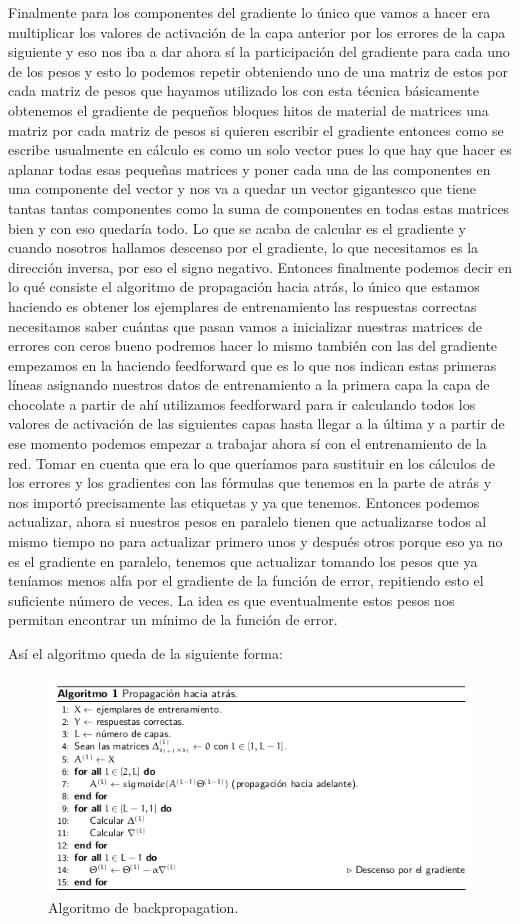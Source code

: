 Finalmente para los componentes del gradiente  lo único que vamos a hacer era multiplicar los valores de activación de la capa anterior por los errores de la capa siguiente y eso nos iba a dar ahora sí la participación del gradiente para cada uno de los pesos y esto lo podemos repetir obteniendo uno de una matriz de estos por cada matriz de pesos que hayamos utilizado los con esta técnica básicamente obtenemos el gradiente de pequeños bloques hitos de material de matrices una matriz por cada matriz de pesos si quieren escribir el gradiente entonces como se escribe usualmente en cálculo es como un solo vector pues lo que hay que hacer es aplanar todas esas pequeñas matrices y poner cada una de las componentes en una componente del vector y nos va a quedar un vector gigantesco que tiene tantas tantas componentes como la suma de componentes en todas estas matrices bien y con eso quedaría todo. 
Lo que  se acaba de calcular es el gradiente y cuando nosotros hallamos descenso por el gradiente, lo que necesitamos es la dirección inversa, por eso el signo negativo. Entonces finalmente podemos decir en lo qué consiste el algoritmo de propagación hacia atrás, lo único que estamos haciendo es obtener los ejemplares de entrenamiento las respuestas correctas necesitamos saber cuántas que pasan vamos a inicializar nuestras matrices de errores con ceros bueno podremos hacer lo mismo también con las del gradiente empezamos en la haciendo feedforward que es lo que nos indican estas primeras líneas asignando nuestros datos de entrenamiento a la primera capa la capa de chocolate a partir de ahí utilizamos feedforward para ir calculando todos los valores de activación de las siguientes capas hasta llegar a la última y a partir de ese momento podemos empezar a trabajar ahora sí con el entrenamiento de la red. Tomar en cuenta que era lo que queríamos para sustituir en los cálculos de los errores y los gradientes con las fórmulas que tenemos en la parte de atrás y nos importó precisamente las etiquetas y ya que tenemos. Entonces podemos actualizar, ahora si nuestros pesos en paralelo tienen que actualizarse todos al mismo tiempo no para actualizar primero unos y después otros porque eso ya no es el gradiente en paralelo, tenemos que actualizar tomando los pesos que ya teníamos menos alfa por el gradiente de la función de error, repitiendo esto el suficiente número de veces. La idea es que eventualmente estos pesos nos permitan encontrar un mínimo de la función de error.

Así el algoritmo queda de la siguiente forma:
\begin{figure}[H]
 \centering
 \includegraphics[scale=0.8]{../Figuras/Algoritmo1.png}
 \caption{Algoritmo de backpropagation.}
 \label{fig:algoritmo}
\end{figure}

